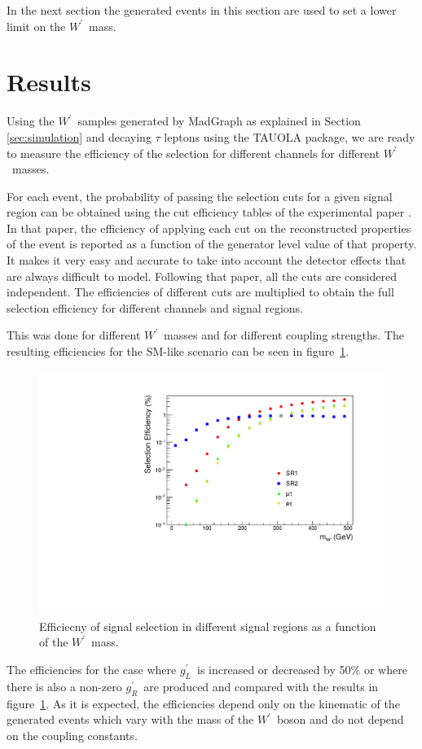 \documentclass[preprint,showpacs,preprintnumbers]{revtex4}
\newcommand{\wprime}{\ensuremath{W^\prime}~}
\newcommand{\gR}{\ensuremath{g^\prime_R}}
\newcommand{\gL}{\ensuremath{g^\prime_L}}
\begin{document}
In the next section the generated events in this section are used to set a lower limit on the \wprime mass.


\section{Results}\label{sec:results} 
Using the \wprime samples generated by MadGraph as explained in Section \ref{sec:simulation} and decaying $\tau$ leptons using the TAUOLA package, we are ready to measure the efficiency of the selection for different channels for different \wprime masses. 

For each event, the probability of passing the selection cuts for a given signal region can be obtained using the cut efficiency tables of the experimental paper \cite{Khachatryan:2016trj}. In that paper, the efficiency of applying each cut on the reconstructed properties of the event is reported as a function of the generator level value of that property. It makes it very easy and accurate to take into account the detector effects that are always difficult to model. Following that paper, all the cuts are considered independent.  The efficiencies of different cuts are multiplied to obtain the full selection efficiency for different channels and signal regions.

This was done for different \wprime masses and for different coupling strengths. The resulting efficiencies for the SM-like scenario can be seen in figure~\ref{fig:EfficiencyGraphs}. 
\begin{figure}[!htb]
	\centering
	\includegraphics*[width=.45\textwidth]{EfficiencyGraphs.pdf}
	\caption{Efficiecny of signal selection in different signal regions as a function of the \wprime mass.}
	\label{fig:EfficiencyGraphs}
\end{figure}
The efficiencies for the case where \gL ~is increased or decreased by 50\% or where there is also a non-zero \gR ~are produced and compared with the results in figure~\ref{fig:EfficiencyGraphs}. As it is expected, the efficiencies depend only on the kinematic of the generated events which vary with the mass of the \wprime boson and do not depend on the coupling constants.
\end{document}
